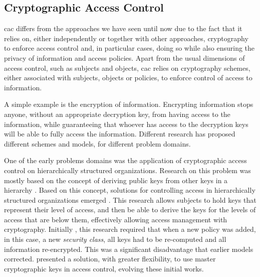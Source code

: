 \subsection{Cryptographic Access Control}

\gls{cac} differs from the approaches we have seen until now due to the fact that it relies on, either independently or together with other approaches, cryptography to enforce access control and, in particular cases, doing so while also ensuring the privacy of information and access policies. Apart from the usual dimensions of access control, such as subjects and objects, \gls{cac} relies on cryptography schemes, either associated with subjects, objects or policies, to enforce control of access to information.

A simple example is the encryption of information. Encrypting information stops anyone, without an appropriate decryption key, from having access to the information, while guaranteeing that whoever has access to the decryption keys will be able to fully access the information. Different research has proposed different schemes and models, for different problem domains.

One of the early problems domains was the application of cryptographic access control on hierarchically structured organizations. Research on this problem was mostly based on the concept of deriving public keys from other keys in a hierarchy \cite{denning_master_1981}. Based on this concept, solutions for controlling access in hierarchically structured organizations emerged \cite{akl_cryptographic_1983, sandhu_cryptographic_1988}. This research allows subjects to hold keys that represent their level of access, and then be able to derive the keys for the levels of access that are below them, effectively allowing access management with cryptography. Initially \cite{akl_cryptographic_1983}, this research required that when a new policy was added, in this case, a new \emph{security class}, all keys had to be re-computed and all information re-encrypted. This was a significant disadvantage that earlier models \cite{sandhu_cryptographic_1988} corrected. \citeauthor{brassard_flexible_1990} \cite{brassard_flexible_1990} presented a solution, with greater flexibility, to use master cryptographic keys in access control, evolving these initial works.


